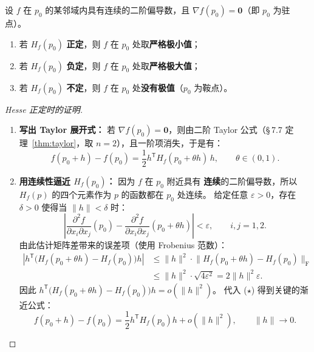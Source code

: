 \documentclass[lang=cn,11pt]{elegantbook}
\begin{document}
\begin{theorem} \label{thm:sufficient-condition-hessian}
设 $f$ 在 $p_0$ 的某邻域内具有连续的二阶偏导数，且 $\nabla f(p_0)=\boldsymbol 0$（即 $p_0$ 为驻点）。
\begin{enumerate}
  \item[(1)] 若 $H_f(p_0)$ \textbf{正定}，则 $f$ 在 $p_0$ 处取\textbf{严格极小值}；
  \item[(2)] 若 $H_f(p_0)$ \textbf{负定}，则 $f$ 在 $p_0$ 处取\textbf{严格极大值}；
  \item[(3)] 若 $H_f(p_0)$ \textbf{不定}，则 $f$ 在 $p_0$ 处\textbf{没有极值}（$p_0$ 为鞍点）。
\end{enumerate}
\end{theorem}

\begin{proof}[Hesse 正定时的证明] \label{proof:hessian-positive-proof}
\begin{enumerate}
  \item \textbf{写出 Taylor 展开式：}
  若 $\nabla f(p_0)=\boldsymbol 0$，则由二阶 Taylor 公式（\S\,7.7 定理~\ref{thm:taylor}，取 $n=2$），且一阶项消失，于是有：
  \begin{equation}\label{eq:taylor-at-stationary}
  f(p_0+h)-f(p_0)=\frac{1}{2} h^{\mathsf T}H_f(p_0+\theta h)\,h, \qquad \theta\in(0,1). \tag{$\star$}
  \end{equation}

  \item \textbf{用连续性逼近 $H_f(p_0)$：}
  因为 $f$ 在 $p_0$ 附近具有 \textbf{连续}的二阶偏导数，所以 $H_f(p)$ 的四个元素作为 $p$ 的函数都在 $p_0$ 处连续。
  给定任意 $\varepsilon>0$，存在 $\delta>0$ 使得当 $\|h\|<\delta$ 时：
  \[
  \left|\frac{\partial^2 f}{\partial x_i\partial x_j}(p_0) - \frac{\partial^2 f}{\partial x_i\partial x_j}(p_0+\theta h)\right| < \varepsilon, \qquad i,j=1,2.
  \]
  由此估计矩阵差带来的误差项（使用 Frobenius 范数）：
  \begin{align*}
  \left|h^{\mathsf T}\!\bigl(H_f(p_0+\theta h)-H_f(p_0)\bigr)h\right| &\leq \|h\|^2\cdot\bigl\|H_f(p_0+\theta h)-H_f(p_0)\bigr\|_{\mathrm F} \\
  &\leq \|h\|^2\cdot\sqrt{4\varepsilon^2}=2\|h\|^2\varepsilon.
  \end{align*}
  因此 $h^{\mathsf T}\!\bigl(H_f(p_0+\theta h)-H_f(p_0)\bigr)h=o(\|h\|^2)$。
  代入 ($\star$) 得到关键的渐近公式：
  \[
  \boxed{
  f(p_0+h)-f(p_0) =\frac{1}{2} h^{\mathsf T}H_f(p_0)h+o(\|h\|^2)},\qquad \|h\|\to 0. \tag{1}
  \]


\end{enumerate}
\end{proof}
\end{document}
